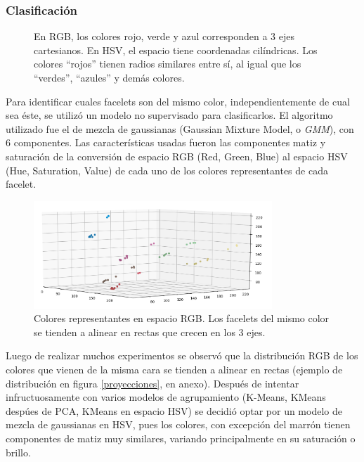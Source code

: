 \subsubsection{Clasificación}
\begin{figure}[h!]
	\centering
	\hfill
	\caption[Espacios de colores.]{En RGB, los colores rojo, verde y azul corresponden a 3 ejes cartesianos. En HSV, el espacio tiene coordenadas cilíndricas. Los colores ``rojos'' tienen radios similares entre sí, al igual que los ``verdes'', ``azules'' y demás colores.}
	\label{colorspace}
\end{figure}
Para identificar cuales facelets son del mismo color, independientemente de cual sea éste, se utilizó un modelo no supervisado para clasificarlos. El algoritmo utilizado fue el de mezcla de gaussianas (Gaussian Mixture Model, o \textit{GMM})\cite{gmm}, con 6 componentes. Las características usadas fueron las componentes matiz y saturación de la conversión de espacio RGB (Red, Green, Blue)\cite{rgb} al espacio HSV (Hue, Saturation, Value)\cite{hsv} de cada uno de los colores representantes de cada facelet.

\begin{figure}[h!]
	\centering
	\includegraphics[width=0.8\textwidth]{figures/rgb_3d}
	\caption{Colores representantes en espacio RGB. Los facelets del mismo color se tienden a alinear en rectas que crecen en los 3 ejes.}
	\label{rgb3d}
\end{figure}


Luego de realizar muchos experimentos se observó que la distribución RGB de los colores que vienen de la misma cara se tienden a alinear en rectas (ejemplo de distribución en figura \ref{proyecciones}, en anexo). Después de intentar infructuosamente con varios modelos de agrupamiento (K-Means, KMeans despúes de PCA, KMeans en espacio HSV) se decidió optar por un modelo de mezcla de gaussianas en HSV, pues los colores, con excepción del marrón tienen componentes de matiz muy similares, variando principalmente en su saturación o brillo.

